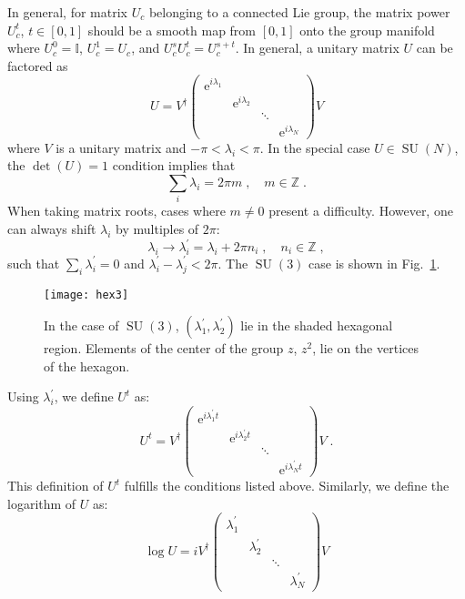 \documentclass[preprint,aps,prd]{revtex4-2}
\newcommand{\da}{\dagger}  %
\newcommand{\be}{\begin{equation}}
\newcommand{\eq}{\end{equation}}
\newcommand{\integer}{\mathbb{Z}}       %
\DeclareMathOperator{\SU}{SU}
\begin{document}
In general, for matrix $U_c$ belonging to a connected Lie group,
the matrix power $U_c^t$, $t\in[0,1]$ should be a
smooth map from $[0,1]$ onto the group manifold where
$U_c^0=\mathbb{I}$, $U_c^1=U_c$, and $U_c^s U_c^t = U_c^{s+t}$.
In general, a unitary matrix $U$ can be factored as
%
\be
U = V^\da \begin{pmatrix}
    \mathrm{e}^{i \lambda_1} & & &\\
    & \mathrm{e}^{i \lambda_2} & &\\
    & & \ddots & \\
    & & & \mathrm{e}^{i \lambda_N}\end{pmatrix} V
\eq
%
where $V$ is a unitary matrix and $-\pi < \lambda_i < \pi$.
In the special case $U \in \SU(N)$, the $\det(U)=1$ condition implies that
\be
\sum_i \lambda_i = 2 \pi m\;, \quad m\in\integer \;.
\eq
When taking matrix roots, cases where $m\neq 0$ present a
difficulty.  However, one can always shift $\lambda_i$ by
multiples of $2\pi$:
\be
\lambda_i \to \lambda_i^\prime = \lambda_i + 2 \pi n_i\;,\quad
n_i\in\integer \; ,
\eq
such that $\sum_i \lambda_i^\prime = 0$ and
$\lambda_i^\prime - \lambda_j^\prime < 2 \pi$.
The $\SU(3)$ case is shown in Fig.~\ref{hexagon}.
%
\begin{figure}
\texttt{[image: hex3]}
  \caption{In the case of $\SU(3)$, $(\lambda_1^\prime,\lambda_2^\prime)$ lie in the shaded hexagonal region.
    Elements of the center of the group $z$, $z^2$, lie on the vertices of the hexagon. \label{hexagon}}
\end{figure}
%
Using $\lambda_i^\prime$, we define $U^t$ as:
\be
U^t = V^\da \begin{pmatrix}
    \mathrm{e}^{i\lambda_1^\prime t} & & &\\
    & \mathrm{e}^{i\lambda_2^\prime t} & &\\
    & & \ddots & \\
    & & & \mathrm{e}^{i\lambda_N^\prime t}\end{pmatrix} V \; .
\eq
This definition of $U^t$ fulfills the conditions listed above.
Similarly, we define the logarithm of $U$ as:
\be
\log U = i V^\da \begin{pmatrix}
    \lambda_1^\prime & & &\\
    & \lambda_2^\prime & &\\
    & & \ddots & \\
    & & & \lambda_N^\prime\end{pmatrix} V
\eq
\end{document}
